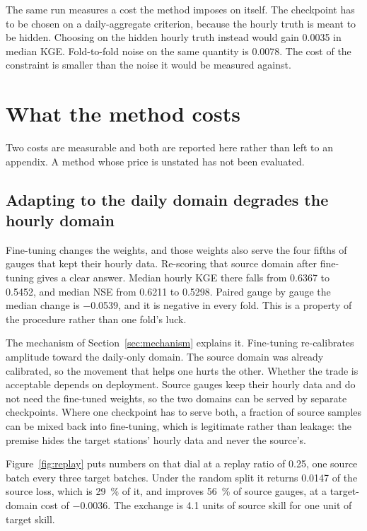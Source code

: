 \documentclass[11pt,a4paper]{article}
\begin{document}
The same run measures a cost the method imposes on itself. The checkpoint has to be chosen on a daily-aggregate criterion, because the hourly truth is meant to be hidden. Choosing on the hidden hourly truth instead would gain \num{0.0035} in median KGE. Fold-to-fold noise on the same quantity is \num{0.0078}. The cost of the constraint is smaller than the noise it would be measured against.

\section{What the method costs}\label{sec:cost}
Two costs are measurable and both are reported here rather than left to an appendix. A method whose price is unstated has not been evaluated.

\subsection{Adapting to the daily domain degrades the hourly domain}
Fine-tuning changes the weights, and those weights also serve the four fifths of gauges that kept their hourly data. Re-scoring that source domain after fine-tuning gives a clear answer. Median hourly KGE there falls from \num{0.6367} to \num{0.5452}, and median NSE from \num{0.6211} to \num{0.5298}. Paired gauge by gauge the median change is \num{-0.0539}, and it is negative in every fold. This is a property of the procedure rather than one fold's luck.

The mechanism of Section~\ref{sec:mechanism} explains it. Fine-tuning re-calibrates amplitude toward the daily-only domain. The source domain was already calibrated, so the movement that helps one hurts the other. Whether the trade is acceptable depends on deployment. Source gauges keep their hourly data and do not need the fine-tuned weights, so the two domains can be served by separate checkpoints. Where one checkpoint has to serve both, a fraction of source samples can be mixed back into fine-tuning, which is legitimate rather than leakage: the premise hides the target stations' hourly data and never the source's.

Figure~\ref{fig:replay} puts numbers on that dial at a replay ratio of \num{0.25}, one source batch every three target batches. Under the random split it returns \num{+0.0147} of the source loss, which is \SI{29}{\percent} of it, and improves \SI{56}{\percent} of source gauges, at a target-domain cost of \num{-0.0036}. The exchange is \num{4.1} units of source skill for one unit of target skill.
\end{document}
